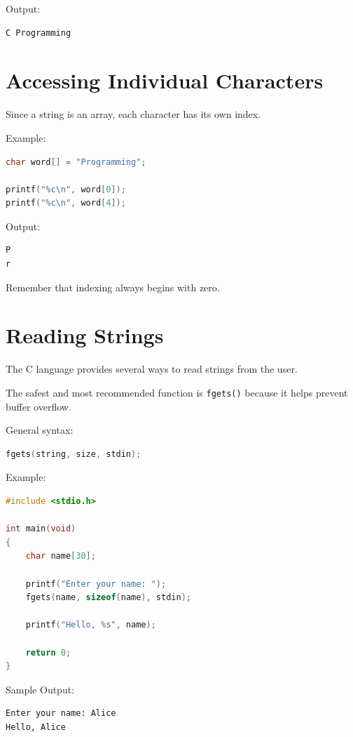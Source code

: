 \documentclass[12pt,openany]{book}
\begin{document}
Output:

\begin{lstlisting}
C Programming
\end{lstlisting}

\section{Accessing Individual Characters}

Since a string is an array, each character has its own index.

Example:

\begin{lstlisting}[language=C]
char word[] = "Programming";

printf("%c\n", word[0]);
printf("%c\n", word[4]);
\end{lstlisting}

Output:

\begin{lstlisting}
P
r
\end{lstlisting}

Remember that indexing always begins with zero.
\section{Reading Strings}

The C language provides several ways to read strings from the user.

The safest and most recommended function is \texttt{fgets()} because it helps prevent buffer overflow.

General syntax:

\begin{lstlisting}[language=C]
fgets(string, size, stdin);
\end{lstlisting}

Example:

\begin{lstlisting}[language=C]
#include <stdio.h>

int main(void)
{
    char name[30];

    printf("Enter your name: ");
    fgets(name, sizeof(name), stdin);

    printf("Hello, %s", name);

    return 0;
}
\end{lstlisting}

Sample Output:

\begin{lstlisting}
Enter your name: Alice
Hello, Alice
\end{lstlisting}
\end{document}
